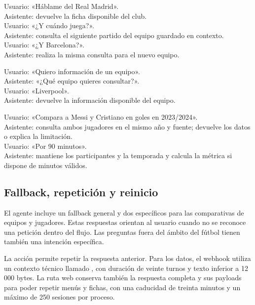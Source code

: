 \documentclass[11pt,a4paper]{article}
\newcommand{\codigo}[1]{\texttt{\detokenize{#1}}}
\begin{document}
\begin{description}[leftmargin=0cm,style=nextline]
\item[Consulta y seguimiento]
Usuario: «Háblame del Real Madrid».\\
Asistente: devuelve la ficha disponible del club.\\
Usuario: «¿Y cuándo juega?».\\
Asistente: consulta el siguiente partido del equipo guardado en contexto.\\
Usuario: «¿Y Barcelona?».\\
Asistente: realiza la misma consulta para el nuevo equipo.
\item[Parámetro incompleto]
Usuario: «Quiero información de un equipo».\\
Asistente: «¿Qué equipo quieres consultar?».\\
Usuario: «Liverpool».\\
Asistente: devuelve la información disponible del equipo.
\item[Comparativa refinada]
Usuario: «Compara a Messi y Cristiano en goles en 2023/2024».\\
Asistente: consulta ambos jugadores en el mismo año y fuente; devuelve los datos o explica la limitación.\\
Usuario: «Por 90 minutos».\\
Asistente: mantiene los participantes y la temporada y calcula la métrica si dispone de minutos válidos.
\end{description}

\subsection{Fallback, repetición y reinicio}

El agente incluye un fallback general y dos específicos para las comparativas de equipos y jugadores. Estas respuestas orientan al usuario cuando no se reconoce una petición dentro del flujo. Las preguntas fuera del ámbito del fútbol tienen también una intención específica.

La acción \codigo{session.repeat} permite repetir la respuesta anterior. Para los datos, el webhook utiliza un contexto técnico llamado \codigo{ultimo_resultado}, con duración de veinte turnos y texto inferior a 12\,000 bytes. La ruta web conserva también la respuesta completa y sus payloads para poder repetir menús y fichas, con una caducidad de treinta minutos y un máximo de 250 sesiones por proceso.
\end{document}
